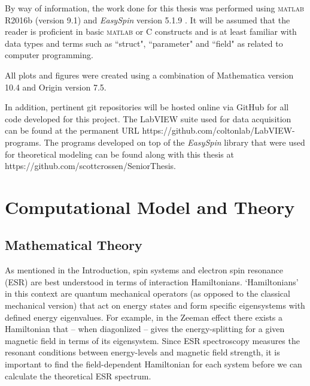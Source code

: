 \documentclass[oneside, noacknowlegments]{BYUPhys}
\begin{document}
By way of information, the work done for this thesis was performed using \textsc{matlab} R2016b (version 9.1) and \textit{EasySpin} version 5.1.9 . It will be assumed that the reader is proficient in basic \textsc{matlab} or C constructs and is at least familiar with data types and terms such as ``struct", ``parameter" and ``field" as related to computer programming.

All plots and figures were created using a combination of Mathematica version 10.4 and Origin version 7.5.

In addition, pertinent git repositories will be hosted online via GitHub for all code developed for this project. The LabVIEW suite used for data acquisition can be found at the permanent URL https://github.com/coltonlab/LabVIEW-programs. The programs developed on top of the \textit{EasySpin} library that were used for theoretical modeling can be found along with this thesis at https://github.com/scottcrossen/SeniorThesis.










\chapter{Computational Model and Theory}

\section{Mathematical Theory}

As mentioned in the Introduction, spin systems and electron spin resonance (ESR) are best understood in terms of interaction Hamiltonians. `Hamiltonians' in this context are quantum mechanical operators (as opposed to the classical mechanical version) that act on energy states and form specific eigensystems with defined energy eigenvalues. For example, in the Zeeman effect there exists a Hamiltonian that -- when diagonlized -- gives the energy-splitting for a given magnetic field in terms of its eigensystem. Since ESR spectroscopy measures the resonant conditions between energy-levels and magnetic field strength, it is important to find the field-dependent Hamiltonian for each system before we can calculate the theoretical ESR spectrum.
\end{document}

